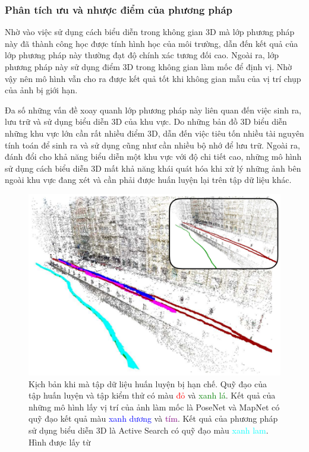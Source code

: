 \subsubsection*{Phân tích ưu và nhược điểm của phương pháp}
Nhờ vào việc sử dụng cách biểu diễn trong không gian 3D mà lớp phương pháp này đã thành công học được tính hình học của môi trường, dẫn đến kết quả của lớp phương pháp này thường đạt độ chính xác tương đối cao. Ngoài ra, lớp phương pháp này sử dụng điểm 3D trong không gian làm mốc để định vị. Nhờ vậy nên mô hình vẫn cho ra được kết quả tốt khi không gian mẫu của vị trí chụp của ảnh bị giới hạn.

Đa số những vấn đề xoay quanh lớp phương pháp này liên quan đến việc sinh ra, lưu trữ và sử dụng biểu diễn 3D của khu vực. Do những bản đồ 3D biểu diễn những khu vực lớn cần rất nhiều điểm 3D, dẫn đến việc tiêu tốn nhiều tài nguyên tính toán để sinh ra và sử dụng cũng như cần nhiều bộ nhớ để lưu trữ. Ngoài ra, đánh đổi cho khả năng biểu diễn một khu vực với độ chi tiết cao, những mô hình sử dụng cách biểu diễn 3D mất khả năng khái quát hóa khi xử lý những ảnh bên ngoài khu vực đang xét và cần phải được huấn luyện lại trên tập dữ liệu khác.

\begin{figure}[H]
    \centering
    \includegraphics[scale=0.7]{pics/Chapter2/lim.png}
    \caption[Kịch bản so sánh phương pháp 3D và phương pháp sử dụng biểu diễn ngầm \cite{sattler2019understanding}]{Kịch bản khi mà tập dữ liệu huấn luyện bị hạn chế. Quỹ đạo của tập huấn luyện và tập kiểm thử có màu \textcolor{red}{đỏ} và \textcolor{green}{xanh lá}. Kết quả của những mô hình lấy vị trí của ảnh làm mốc là PoseNet \cite{kendall2016posenet} và MapNet \cite{brahmbhatt2018geometryaware} có quỹ đạo kết quả màu \textcolor{blue}{xanh dương} và \textcolor{purple}{tím}. Kết quả của phương pháp sử dụng biểu diễn 3D là Active Search \cite{sattler2016efficient} có quỹ đạo màu \textcolor{cyan}{xanh lam}. Hình được lấy từ \cite{sattler2019understanding}}
\end{figure}


